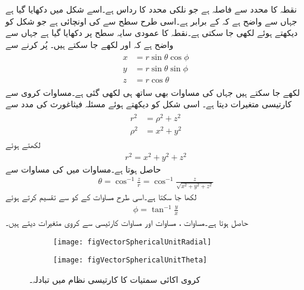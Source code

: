 نقطہ  کا  محدد سے فاصلہ   ہے جو نلکی محدد کا رداس ہے۔اسے شکل  میں دکھایا گیا ہے جہاں سے واضح ہے کہ  کے برابر ہے۔اسی طرح  سطح سے  کی اونچائی  ہے جو شکل کو دیکھتے ہوئے   لکھی جا سکتی ہے۔نقطہ  کا عمودی سایہ  سطح پر دکھایا گیا ہے جہاں سے واضح ہے کہ  اور  لکھے جا سکتے ہیں۔ پُر کرنے سے
\begin{gather}
\begin{aligned}\label{مساوات_سمتیہ_کروی_سے_کارتیسی}
x&=r \sin \theta \cos \phi\\
y&=r \sin \theta \sin \phi\\
z&=r \cos \theta
\end{aligned}
\end{gather}
لکھے جا سکتے ہیں جہاں  کی مساوات بھی ساتھ ہی لکھی  گئی ہے۔مساوات  کروی سے کارتیسی متغیرات دیتا ہے۔ اسی شکل کو دیکھتے ہوئے مسئلہ فیثاغورث کی مدد سے
\begin{gather}
\begin{aligned}
r^2&=\rho^2+z^2\\
\rho^2&=x^2+y^2
\end{aligned}
\end{gather}
لکھتے ہوئے
\begin{align}\label{مساوات_سمتیہ_کروی_رداس}
r^2=x^2+y^2+z^2
\end{align}
حاصل ہوتا ہے۔مساوات  میں  کی مساوات سے
\begin{align}\label{مساوات_سمتیہ_کروی_تھیٹا}
\theta = \cos^{-1} \frac{z}{r}=\cos^{-1}\frac{z}{\sqrt{x^2+y^2+z^2}}
\end{align}
 لکھا جا سکتا ہے۔اسی طرح  مساوات  کے  کو  سے تقسیم کرتے ہوئے
\begin{align}\label{مساوات_سمتیہ_کروی_فائے}
\phi = \tan^{-1} \frac{y}{x}
\end{align}
حاصل ہوتا ہے۔مساوات ، مساوات  اور مساوات  کارتیسی سے کروی متغیرات دیتے ہیں۔
\begin{figure}
\centering
\begin{subfigure}{0.5\textwidth}
\centering
\texttt{[image: figVectorSphericalUnitRadial]}
\end{subfigure}%
%
\begin{subfigure}{0.5\textwidth}
\centering
\texttt{[image: figVectorSphericalUnitTheta]}
\end{subfigure}%
\caption{کروی اکائی سمتیات کا کارتیسی نظام میں تبادلہ۔}
\label{شکل_سمتیہ_کروی_اکائی_رداسی_سمتیہ_کارتیسی}
\end{figure}

